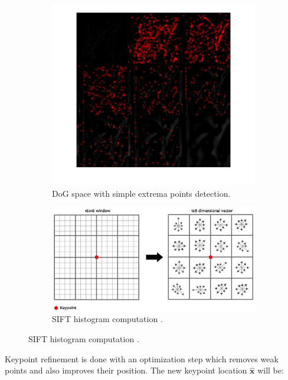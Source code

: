 \documentclass[12pt]{article}
\begin{document}
\begin{figure}[htbp!]
	\centering
	\begin{subfigure}[a]{0.59\textwidth}
		\includegraphics[width=\textwidth]{images/DoGWithExtrema}
		\caption{DoG space with simple extrema points detection.}
		\label{fig:histoCal}
	\end{subfigure}
	\begin{subfigure}[a]{0.39\textwidth}
		\includegraphics[width=\textwidth]{images/siftHistograms}
		\caption{SIFT histogram computation \cite{Gu2013}.}
		\label{fig:histoCal}
	\end{subfigure}
\end{figure}

Keypoint refinement is done with an optimization step which removes weak points and also improves their position.
The new keypoint location $\mathbf{\hat{x}}$ will be:
\end{document}
